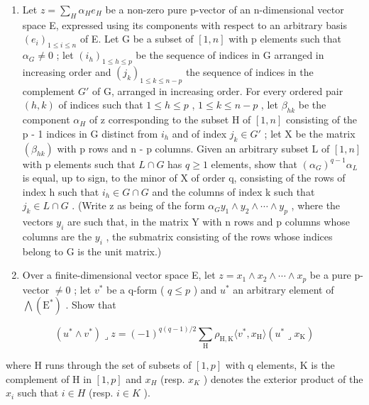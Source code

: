 \begin{enumerate}
\def\labelenumi{\arabic{enumi}.}
\setcounter{enumi}{17}
\item
  Let \(z = \sum_{H} \alpha_{H} e_{H}\) be a non-zero pure p-vector of an n-dimensional vector space E, expressed using its components with respect to an arbitrary basis \((e_{i})_{1 \leqslant i \leqslant n}\) of E. Let G be a subset of \([1, n]\) with p elements such that \(\alpha_{G} \neq 0\) ; let \((i_{h})_{1 \leqslant h \leqslant p}\) be the sequence of indices in G arranged in increasing order and \((j_{k})_{1 \leqslant k \leqslant n - p}\) the sequence of indices in the complement \(G'\) of G, arranged in increasing order. For every ordered pair \((h, k)\) of indices such that \(1 \leqslant h \leqslant p\) , \(1 \leqslant k \leqslant n - p\) , let \(\beta_{hk}\) be the component \(\alpha_{H}\) of z corresponding to the subset H of \([1, n]\) consisting of the p - 1 indices in G distinct from \(i_{h}\) and of index \(j_{k} \in G'\) ; let X be the matrix \((\beta_{hk})\) with p rows and n - p columns. Given an arbitrary subset L of \([1, n]\) with p elements such that \(L \cap G\) has \(q \geqslant 1\) elements, show that \((\alpha_{G})^{q-1} \alpha_{L}\) is equal, up to sign, to the minor of X of order q, consisting of the rows of index h such that \(i_{h} \in G \cap G\) and the columns of index k such that \(j_{k} \in L \cap G\) . (Write z as being of the form \(\alpha_{G} y_{1} \wedge y_{2} \wedge \cdots \wedge y_{p}\) , where the vectors \(y_{i}\) are such that, in the matrix Y with n rows and p columns whose columns are the \(y_{i}\) , the submatrix consisting of the rows whose indices belong to G is the unit matrix.)
\item
  Over a finite-dimensional vector space E, let \(z = x_{1} \wedge x_{2} \wedge \cdots \wedge x_{p}\) be a pure p-vector \(\neq 0\) ; let \(v^{*}\) be a q-form ( \(q \leqslant p\) ) and \(u^{*}\) an arbitrary element of \(\bigwedge(\mathrm{E}^{*})\) . Show that
\end{enumerate}

\[
(u ^ {*} \wedge v ^ {*}) \lrcorner z = (- 1) ^ {q (q - 1) / 2} \sum_ {\mathrm{H}} \rho_ {\mathrm{H}, \mathrm{K}} \langle v ^ {*}, x _ {\mathrm{H}} \rangle (u ^ {*} \lrcorner x _ {\mathrm{K}})
\]

where H runs through the set of subsets of \([1, p]\) with q elements, K is the complement of H in \([1, p]\) and \(x_{H}\) (resp. \(x_{K}\) ) denotes the exterior product of the \(x_{i}\) such that \(i \in H\) (resp. \(i \in K\) ).

